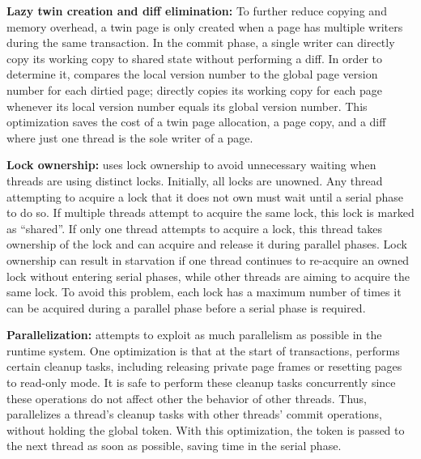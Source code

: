 \textbf{Lazy twin creation and diff elimination: }
To further reduce copying and memory overhead, a twin page is only created when a page has multiple writers during the same transaction. In the commit phase, a single writer can directly copy its working copy to shared state without performing a diff. In order to determine it, \dthreads{} compares the local version number to the global page version number for each dirtied page; \dthreads{} directly copies its working copy for each page whenever its local version number equals its global version number. This optimization saves the cost of a twin page allocation, a page copy, and a diff where just one thread is the sole writer of a page.


\textbf{Lock ownership:} \dthreads{} uses lock ownership to avoid unnecessary waiting when threads are using distinct locks. Initially, all locks are unowned. Any thread attempting to acquire a lock that it does not own must wait until a serial phase to do so. If multiple threads attempt to acquire the same lock, this lock is marked as ``shared''. If only one thread attempts to acquire a lock, this thread takes ownership of the lock and can acquire and release it during parallel phases. Lock ownership can result in starvation if one thread continues to re-acquire an owned lock without entering serial phases, while other threads are aiming to acquire the same lock. To avoid this problem, each lock has a maximum number of times it can be acquired during a parallel phase before a serial phase is required.

\textbf{Parallelization: }
\dthreads{} attempts to exploit as much parallelism as possible in the runtime system. One optimization is that at the start of transactions, \dthreads{} performs certain cleanup tasks, including releasing private page frames or resetting pages to read-only mode. It is safe to perform these cleanup tasks concurrently since these operations do not affect other the behavior of other threads.
Thus, \dthreads{} parallelizes a thread's cleanup tasks with other threads’ commit operations, without holding the global token. With this optimization, the token is passed to the next thread as soon as possible, saving time in the serial phase. 